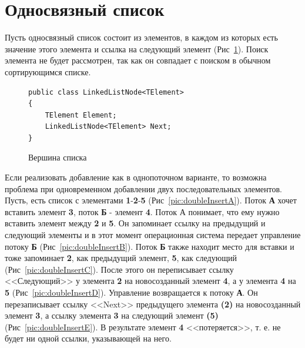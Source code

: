 \documentclass[12pt]{report}
\begin{document}
{		\section{Односвязный список}
		\par Пусть односвязный список состоит из элементов, в каждом из которых есть значение этого элемента и ссылка на следующий элемент (Рис~\ref{pic:listNode}). Поиск элемента не будет рассмотрен, так как он совпадает с поиском в обычном сортирующимся списке.
		\begin{figure}[h]
			\begin{lstlisting}
public class LinkedListNode<TElement>
{
	TElement Element;
	LinkedListNode<TElement> Next;
}
			\end{lstlisting}
			\caption{Вершина списка}
			\label{pic:listNode}
		\end{figure}
		\par Если реализовать добавление как в однопоточном варианте, то возможна проблема при одновременном добавлении двух последовательных элементов. Пусть, есть список с элементами \textbf{1}-\textbf{2}-\textbf{5} (Рис~\ref{pic:doubleInsertA}). Поток \textbf{А} хочет вставить элемент \textbf{3}, поток \textbf{Б} - элемент \textbf{4}. Поток А понимает, что ему нужно вставить элемент между \textbf{2} и \textbf{5}. Он запоминает ссылку на предыдущий и следующий элементы и в этот момент операционная система передает управление потоку \textbf{Б} (Рис~\ref{pic:doubleInsertB}). Поток \textbf{Б} также находит место для вставки и тоже запоминает \textbf{2}, как предыдущий элемент, \textbf{5}, как следующий (Рис~\ref{pic:doubleInsertC}). После этого он переписывает ссылку <<Следующий>> у элемента \textbf{2} на новосозданный элемент \textbf{4}, а у элемента \textbf{4} на \textbf{5} (Рис~\ref{pic:doubleInsertD}). Управление возвращается к потоку \textbf{А}. Он перезаписывает ссылку <<Next>> предыдущего элемента \textbf{(2)} на новосозданный элемент \textbf{3}, а ссылку элемента \textbf{3} на следующий элемент \textbf{(5)} (Рис~\ref{pic:doubleInsertE}). В результате элемент \textbf{4} <<потеряется>>, т. е. не будет ни одной ссылки, указывающей на него.
		\begin{figure}[h!]
			\begin{minipage}[h]{0.45\linewidth}
				\center {}
\end{minipage}
\end{figure}}
\end{document}
